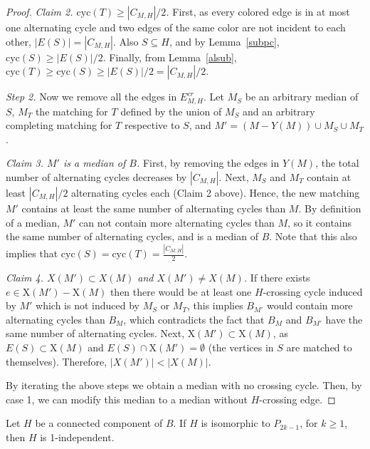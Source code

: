 \documentclass[10pt]{llncs}
\begin{document}
\begin{proof}
  {\smallskip\noindent\em Claim 2. $\text{cyc}(T) \geq
    |C_{M,H}|/2$.} First, as every colored edge is in at most one
  alternating cycle and two edges of the same color are not incident
  to each other, $|E(S)| = |C_{M,H}|$. Also $S \subseteq H$, and
  by Lemma~\ref{subpc}, $\text{cyc}(S) \geq |E(S)|/2$. Finally, from
  Lemma~\ref{alsub}, $\text{cyc}(T) \geq \text{cyc}(S) \geq |E(S)|/2 =
  |C_{M,H}|/2$.

  {\smallskip\noindent\em Step 2.} Now we remove all the edges in
  $E^{cr}_{M,H}$. Let $M_S$ be an arbitrary median of $S$, $M_T$ the
  matching for $T$ defined by the union of $M_S$ and an arbitrary
  completing matching for $T$ respective to $S$, and $M' = (M -Y(M))
  \cup M_S \cup M_T$.

  {\smallskip\noindent\em Claim 3. $M'$ is a median of $B$.}  First,
  by removing the edges in $Y(M)$, the total number of
  alternating cycles decreases by $|C_{M,H}|$. Next, $M_S$ and $M_T$
  contain at least $|C_{M,H}|/2$ alternating cycles each (Claim 2
  above). Hence, the new matching $M'$ contains at least the same
  number of alternating cycles than $M$. By definition of a median,
  $M'$ can not contain more alternating cycles than $M$, so it
  contains the same number of alternating cycles, and is a median of
  $B$. Note that this also implies that $\text{cyc}(S) = \text{cyc}(T)
  = \frac{|C_{M,H}|}{2}$.
  
{\smallskip\noindent\em Claim 4. $X(M') \subset X(M)$ and $X(M')
    \neq X(M)$.}  If there exists $e \in \text{X}(M') - \text{X}(M)$
  then there would be at least one $H$-crossing cycle induced by $M'$
  which is not induced by $M_S$ or $M_T$, this implies $B_{M'}$ would contain
  more alternating cycles than $B_{M}$, which contradicts the fact
  that $B_M$ and $B_{M'}$ have the same number of alternating cycles.
  Next, $\text{X}(M') \subset \text{X}(M)$, as $E(S) \subset
  \text{X}(M)$ and $E(S) \cap \text{X}(M') = \emptyset$ (the vertices
  in $S$ are matched to themselves). Therefore, $|X(M')| < |X(M)|$.

  By iterating the above steps we obtain a median with no crossing
  cycle. Then, by case 1, we can modify this median to a median
  without $H$-crossing edge. \end{proof}





\begin{proposition}\label{1dep}
  Let $H$ be a connected component of $B$. If $H$ is isomorphic to
  $P_{2k-1}$, for $k \geq 1$, then $H$ is 1-independent. 
\end{proposition}
\end{document}
